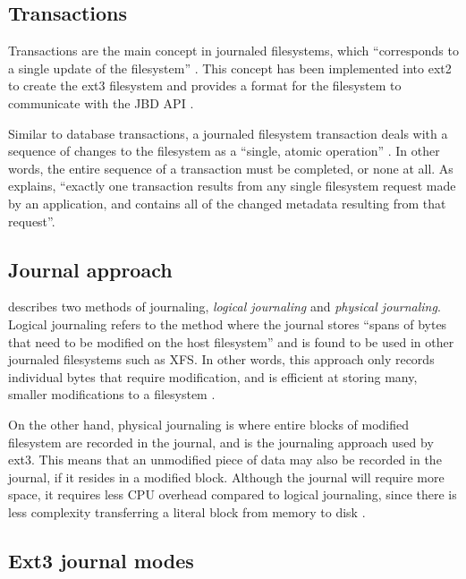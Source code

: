 \subsection{Transactions}

Transactions are the main concept in journaled filesystems, which ``corresponds to a single update of the filesystem'' \citep[p. 4]{Tweedie1998}. This concept has been implemented into ext2 to create the ext3 filesystem and provides a format for the filesystem to communicate with the JBD API \citep{Tweedie2000}.

Similar to database transactions, a journaled filesystem transaction deals with a sequence of changes to the filesystem as a ``single, atomic operation'' \citep[p. 4]{Best2002}. In other words, the entire sequence of a transaction must be completed, or none at all. As \citet[p. 4]{Tweedie2000} explains, ``exactly one transaction results from any single filesystem request made by an application, and contains all of the changed metadata resulting from that request''.

\subsection{Journal approach}

\citet[p. 3]{Robbins2001a} describes two methods of journaling, \emph{logical journaling} and \emph{physical journaling}. Logical journaling refers to the method where the journal stores ``spans of bytes that need to be modified on the host filesystem'' and is found to be used in other journaled filesystems such as XFS. In other words, this approach only records individual bytes that require modification, and is efficient at storing many, smaller modifications to a filesystem \citep{Robbins2001a}.

On the other hand, physical journaling is where entire blocks of modified filesystem are recorded in the journal, and is the journaling approach used by ext3. This means that an unmodified piece of data may also be recorded in the journal, if it resides in a modified block. Although the journal will require more space, it requires less CPU overhead compared to logical journaling, since there is less complexity transferring a literal block from memory to disk \citep{Robbins2001a}.

\subsection{Ext3 journal modes}

